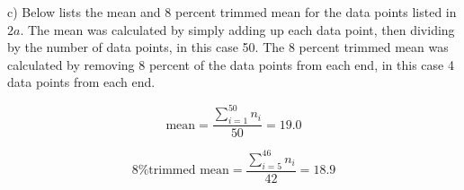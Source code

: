 \documentclass[12pt, letterpaper]{article}
\begin{document}
\pagebreak

\qquad c) Below lists the mean and 8 percent trimmed mean for the data points listed in $2a$. The mean was calculated by simply adding up each data point, then dividing by the number of data points, in this case 50. The 8 percent trimmed mean was calculated by removing 8 percent of the data points from each end, in this case 4 data points from each end.

$$\text{mean} = \frac{\sum\limits_{i=1}^{50} n_{i}}{50} = \boxed{19.0}$$

$$\text{8\% trimmed mean} = \frac{\sum\limits_{i=5}^{46} n_{i}}{42} = \boxed{18.9}$$
\end{document}
